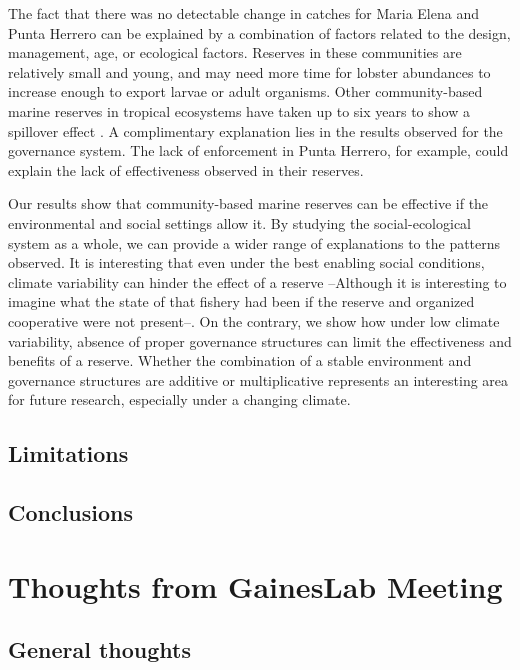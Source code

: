 \documentclass{frontiersSCNS}
\theoremstyle{definition}
\theoremstyle{definition}
\theoremstyle{definition}
\theoremstyle{remark}
\begin{document}
The fact that there was no detectable change in catches for Maria Elena
and Punta Herrero can be explained by a combination of factors related
to the design, management, age, or ecological factors. Reserves in these
communities are relatively small and young, and may need more time for
lobster abundances to increase enough to export larvae or adult
organisms. Other community-based marine reserves in tropical ecosystems
have taken up to six years to show a spillover effect
\citep{dasilva_2015-zX}. A complimentary explanation lies in the results
observed for the governance system. The lack of enforcement in Punta
Herrero, for example, could explain the lack of effectiveness observed
in their reserves.

Our results show that community-based marine reserves can be effective
if the environmental and social settings allow it. By studying the
social-ecological system as a whole, we can provide a wider range of
explanations to the patterns observed. It is interesting that even under
the best enabling social conditions, climate variability can hinder the
effect of a reserve --Although it is interesting to imagine what the
state of that fishery had been if the reserve and organized cooperative
were not present--. On the contrary, we show how under low climate
variability, absence of proper governance structures can limit the
effectiveness and benefits of a reserve. Whether the combination of a
stable environment and governance structures are additive or
multiplicative represents an interesting area for future research,
especially under a changing climate.

\subsection{Limitations}\label{limitations}

\subsection{Conclusions}\label{conclusions}

\section{Thoughts from GainesLab
Meeting}\label{thoughts-from-gaineslab-meeting}

\subsection{General thoughts}\label{general-thoughts}
\end{document}
